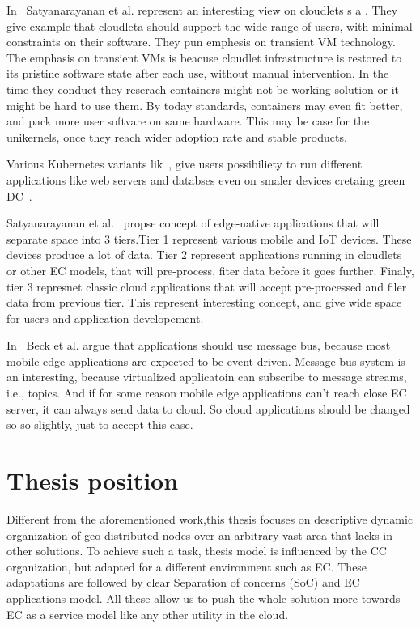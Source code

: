 In~\cite{SatyanarayananBCD09} Satyanarayanan et al. represent an interesting view on cloudlets s a . They give example that cloudleta should support the wide range of users, with minimal constraints on their software. They pun emphesis on transient VM technology. The emphasis on transient VMs is beacuse cloudlet infrastructure is restored to its pristine software state after each use, without manual intervention. In the time they conduct they reserach containers might not be working solution or it might be hard to use them. By today standards, containers may even fit better, and pack more user softvare on same hardware. This may be case for the unikernels, once they reach wider adoption rate and stable products.

Various Kubernetes variants lik~\cite{KubeEdge, RossiCPN20}, give users possibiliety to run different applications like web servers and databses even on smaler devices cretaing green DC~\cite{ArocaG12}.

Satyanarayanan et al.~\cite{SatyanarayananK19} propse concept of edge-native applications that will separate space into 3 tiers.Tier 1 represent various mobile and IoT devices. These devices produce a lot of data. Tier 2 represent applications running in cloudlets or other EC models, that will pre-process, fiter data before it goes further. Finaly, tier 3 represnet classic cloud applications that will accept pre-processed and filer data from previous tier. This represent interesting concept, and give wide space for users and application developement.

In~\cite{inproceedingsBeck} Beck et al. argue that applications should use message bus, because most mobile edge applications are expected to be event driven.  Message bus system is an interesting, because virtualized applicatoin can subscribe to message streams, i.e., topics. And if for some reason mobile edge applications can't reach close EC server, it can always send data to cloud. So cloud applications should be changed so so slightly, just to accept this case.
%
%
\section{Thesis position}\label{sec:thesis_position}
Different from the aforementioned work,this thesis focuses on descriptive dynamic organization of geo-distributed nodes over an arbitrary vast area that lacks in other solutions. To achieve such a task, thesis model is influenced by the CC organization, but adapted for a different environment such as EC. These adaptations are followed by clear Separation of concerns (SoC) and EC applications model. All these allow us to push the whole solution more towards EC as a service model like any other utility in the cloud.
%
%